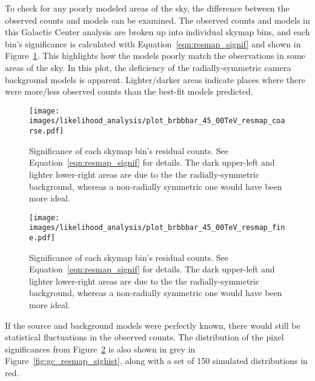   To check for any poorly modeled areas of the sky, the difference between the observed counts and models can be examined.
  The observed counts and models in this Galactic Center analysis are broken up into individual skymap bins, and each bin's significance is calculated with Equation~\ref{eqn:resmap_signif} and shown in Figure~\ref{fig:gc_resmap}.
  This highlights how the models poorly match the observations in some areas of the sky.
  In this plot, the deficiency of the radially-symmetric camera background models is apparent.
  Lighter/darker areas indicate places where there were more/less observed counts than the best-fit models predicted.
  
  \begin{figure}[ht]
    \centering
    \texttt{[image: images/likelihood\_analysis/plot\_brbbbar\_45\_00TeV\_resmap\_coarse.pdf]}
    \caption[Galactic Center Residual Map Coarse Binning]
    {
      Significance of each skymap bin's residual counts.
      See Equation~\ref{eqn:resmap_signif} for details.
      The dark upper-left and lighter lower-right areas are due to the the radially-symmetric background, whereas a non-radially symmetric one would have been more ideal.
    }
    \label{fig:gc_resmap}
  \end{figure}
  
  \begin{figure}[ht]
    \centering
    \texttt{[image: images/likelihood\_analysis/plot\_brbbbar\_45\_00TeV\_resmap\_fine.pdf]}
    \caption[Galactic Center Residual Map Fine Binning]
    {
      Significance of each skymap bin's residual counts.
      See Equation~\ref{eqn:resmap_signif} for details.
      The dark upper-left and lighter lower-right areas are due to the the radially-symmetric background, whereas a non-radially symmetric one would have been more ideal.
    }
    \label{fig:gc_resmap_fine}
  \end{figure}
  
  If the source and background models were perfectly known, there would still be statistical fluctuations in the observed counts.
  The distribution of the pixel significances from Figure~\ref{fig:gc_resmap_fine} is also shown in grey in Figure~\ref{fig:gc_resmap_sighist}, along with a set of 150 simulated distributions in red.
  
